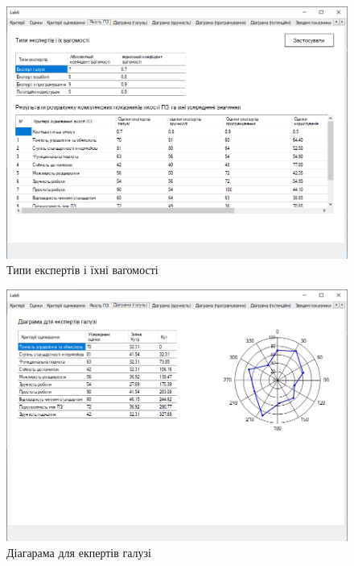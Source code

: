 \documentclass[14pt]{extreport}
\begin{document}
\begin{normalsize}
\begin{figure}[H]
	\centering
	\includegraphics[scale=0.55]{4}
	\caption{Типи експертів і їхні вагомості}
\end{figure}

\begin{figure}[H]
	\centering
	\includegraphics[scale=0.55]{5}
	\caption{Діагарама для екпертів галузі}
\end{figure}


\end{normalsize}
\end{document}
